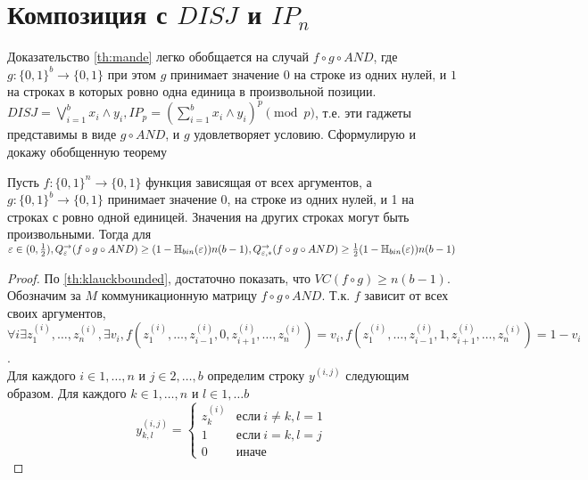\documentclass{article}
\begin{document}
\section{Композиция с $DISJ$ и $IP_n$}
\label{sec:disj}
Доказательство \autoref{th:mande} легко обобщается на случай $f \circ g \circ AND$, где $g: \{0, 1\}^b \to \{0, 1\}$ при этом $g$ принимает значение $0$ на строке из одних нулей, и $1$ на строках в которых ровно одна единица в произвольной позиции. $DISJ = \bigvee_{i=1}^{b}x_i \wedge y_i, IP_p = (\sum_{i=1}^{b}x_i \wedge y_i)^{p} \pmod{p}$, т.е. эти гаджеты представимы в виде $g \circ AND$, и $g$ удовлетворяет условию. Сформулирую и докажу обобщенную теорему
\begin{theorem}
    Пусть $f: \{0, 1\}^n \to \{0, 1\}$ функция зависящая от всех аргументов, а $g: \{0, 1\}^b \to \{0, 1\}$ принимает значение 0, на строке из одних нулей, и 1 на строках с ровно одной единицей. Значения на других строках могут быть произвольными. Тогда для $\varepsilon \in (0, \frac{1}{2}), Q^{\to}_{\varepsilon}(f \circ g \circ AND) \geq (1 - \mathbb{H}_{bin}(\varepsilon))n(b - 1), Q^{\to}_{\varepsilon, *}(f \circ g \circ AND) \geq \frac{1}{2}(1 - \mathbb{H}_{bin}(\varepsilon))n(b - 1)$  
    \begin{proof}
    По \autoref{th:klauckbounded}, достаточно показать, что $VC(f \circ g) \geq n(b - 1)$. Обозначим за $M$ коммуникационную матрицу $f \circ g \circ AND$. Т.к. $f$ зависит от всех своих аргументов, $\forall i \exists z_1^{(i)}, \ldots, z_n^{(i)}, \exists v_i, f(z_1^{(i)}, \ldots, z_{i-1}^{(i)}, 0, z_{i+1}^{(i)}, \ldots, z_{n}^{(i)}) = v_i, f(z_1^{(i)}, \ldots, z_{i-1}^{(i)}, 1, z_{i+1}^{(i)}, \ldots, z_{n}^{(i)}) = 1 - v_i$.\\
    Для каждого $i \in 1, \ldots, n$ и $j \in 2, \ldots, b$ определим строку $y^{(i, j)}$ следующим образом. Для каждого $k \in 1, \ldots, n$ и $l \in 1, \ldots b$
    $$
    y_{k, l}^{(i, j)} = \begin{cases}
        z_{k}^{(i)} & \textit{если}\ i \neq k, l = 1\\
        1 & \textit{если}\ i = k, l = j\\
        0 & \textit{иначе}  
    \end{cases} 
    $$  

\end{proof}
\end{theorem}
\end{document}
